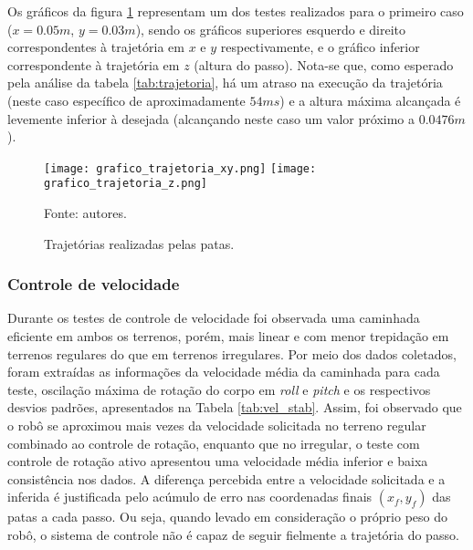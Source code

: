 \documentclass[../main.tex]{subfiles}
\begin{document}
  Os gráficos da figura \ref{fig:grafico_trajetoria_xyz} representam um dos testes realizados para o primeiro caso ($x=0.05m$, $y=0.03m$), sendo os gráficos superiores esquerdo e direito correspondentes à trajetória em $x$ e $y$ respectivamente, e o gráfico inferior correspondente à trajetória em $z$ (altura do passo). Nota-se que, como esperado pela análise da tabela \ref{tab:trajetoria}, há um atraso na execução da trajetória (neste caso específico de aproximadamente $54ms$) e a altura máxima alcançada é levemente inferior à desejada (alcançando neste caso um valor próximo a $0.0476m$).

  \begin{figure}[h]
    \centering
    \caption{Trajetórias realizadas pelas patas.}
    \texttt{[image: grafico\_trajetoria\_xy.png]}
    \texttt{[image: grafico\_trajetoria\_z.png]}
    
    Fonte: autores.
    \label{fig:grafico_trajetoria_xyz}
  \end{figure}

  \subsubsection{Controle de velocidade}
  Durante os testes de controle de velocidade foi observada uma caminhada eficiente em ambos os terrenos, porém, mais linear e com menor trepidação em terrenos regulares do que em terrenos irregulares. Por meio dos dados coletados, foram extraídas as informações da velocidade média da caminhada para cada teste, oscilação máxima de rotação do corpo em \textit{roll} e \textit{pitch} e os respectivos desvios padrões, apresentados na Tabela \ref{tab:vel_stab}. Assim, foi observado que o robô se aproximou mais vezes da velocidade solicitada no terreno regular combinado ao controle de rotação, enquanto que no irregular, o teste com controle de rotação ativo apresentou uma velocidade média inferior e baixa consistência nos dados. A diferença percebida entre a velocidade solicitada e a inferida é justificada pelo acúmulo de erro nas coordenadas finais $(x_f, y_f)$ das patas a cada passo. Ou seja, quando levado em consideração o próprio peso do robô, o sistema de controle não é capaz de seguir fielmente a trajetória do passo.
\end{document}
